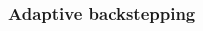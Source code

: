 \begin{frame}
\frametitle{Adaptive backstepping}
%
\begin{columns}
	\begin{column}{0.5\textwidth}
	\begin{figure}
	\end{figure}
	\end{column}
	\begin{column}{0.5\textwidth}
	\begin{figure}
	\end{figure}
	\end{column}
\end{columns}
\end{frame}
